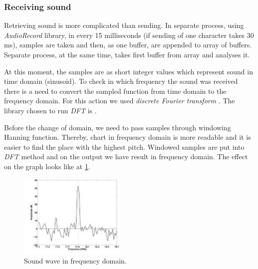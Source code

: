 \documentclass[11pt,titlepage]{article}
\theoremstyle{plain}
\begin{document}
\subsubsection{Receiving sound}

Retrieving sound is more complicated than sending. In separate process, using \textit{AudioRecord} library, in every 15 milliseconds (if sending of one character takes 30 ms), samples are taken and then, as one buffer, are appended to array of buffers. Separate process, at the same time, takes first buffer from array and analyses it. 

\vspace{5mm}

At this moment, the samples are as short integer values which represent sound in time domain (sinusoid). To check in which frequency the sound was received there is a need to convert the sampled function from time domain to the frequency domain. For this action we used \textit{discrete Fourier transform }. The library chosen to run \textit{DFT} is \cite{minim_dft}. 

\vspace{5mm}

Before the change of domain, we need to pass samples through windowing Hanning function. Thereby, chart in frequency domain is more readable and it is easier to find the place with the highest pitch. Windowed samples are put into \textit{DFT} method and on the output we have result in frequency domain. The effect on the graph looks like at \ref{fig:F2}.


\begin{figure}[H]
	\centering
	\includegraphics[width=0.45\textwidth]{img/peaks_1}
	\caption{Sound wave in frequency domain.}
	\label{fig:F2}
\end{figure}
\end{document}
